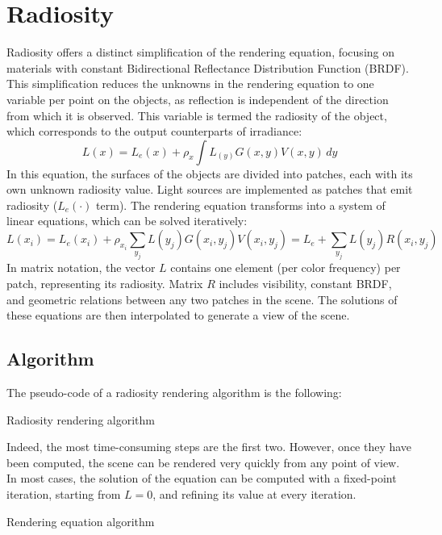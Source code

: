 \section{Radiosity}

Radiosity offers a distinct simplification of the rendering equation, focusing on materials with constant Bidirectional Reflectance Distribution Function (BRDF). 
This simplification reduces the unknowns in the rendering equation to one variable per point on the objects, as reflection is independent of the direction from which it is observed. 
This variable is termed the radiosity of the object, which corresponds to the output counterparts of irradiance:
\[L(x)=L_e(x)+\rho_x\int L_(y)G(x,y)V(x,y)\,dy\]
In this equation, the surfaces of the objects are divided into patches, each with its own unknown radiosity value.
Light sources are implemented as patches that emit radiosity ($L_e(\cdot)$ term). 
The rendering equation transforms into a system of linear equations, which can be solved iteratively:
\[L(x_i)=L_e(x_i)+\rho_{x_i}\sum_{y_j}L(y_j)G(x_i,y_j)V(x_i,y_j)=L_e+\sum_{y_j}L(y_j)R(x_i,y_j)\]
In matrix notation, the vector $L$ contains one element (per color frequency) per patch, representing its radiosity.
Matrix $R$ includes visibility, constant BRDF, and geometric relations between any two patches in the scene. 
The solutions of these equations are then interpolated to generate a view of the scene.

\subsection{Algorithm}
The pseudo-code of a radiosity rendering algorithm is the following:
\begin{algorithm}[H]
    \caption{Radiosity rendering algorithm}
        \begin{algorithmic}[1]
        \end{algorithmic}
\end{algorithm}
Indeed, the most time-consuming steps are the first two.
However, once they have been computed, the scene can be rendered very quickly from any point of view. 
In most cases, the solution of the equation can be computed with a fixed-point iteration, starting from $L = 0$, and refining its value at every iteration.
\begin{algorithm}[H]
    \caption{Rendering equation algorithm}
        \begin{algorithmic}[1]
            \Repeat{}
        \end{algorithmic}
\end{algorithm}